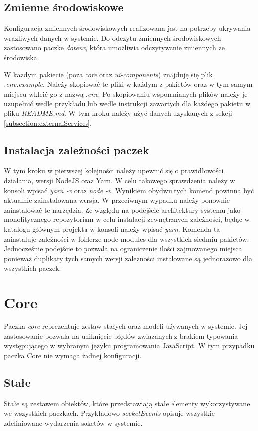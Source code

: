 \label{subsection:envs}
\subsection{Zmienne środowiskowe}
Konfiguracja zmiennych środowiskowych realizowana jest na potrzeby ukrywania wrazliwych danych w systemie.
Do odczytu zmiennych środowiskowych zastosowano paczke \textit{dotenv}, która umożliwia odczytywanie zmiennych ze środowiska.

W każdym pakiecie (poza \textit{core} oraz \textit{ui-components}) znajduję się plik \textit{.env.example}. Należy skopiować te pliki w każdym z pakietów oraz w tym samym miejscu wkleić go z nazwą \textit{.env}. Po skopiowaniu wspomnianych plików należy je uzupełnić wedle przykładu lub wedle instrukcji zawartych dla każdego pakietu w pliku \textit{README.md}. W tym kroku należy użyć danych uzyskanych z sekcji \ref{subsection:externalServices}.

\subsection{Instalacja zależności paczek}
W tym kroku w pierwszej kolejności należy upewnić się o prawidłowości działania, wersji NodeJS oraz Yarn. W celu takowego sprawdzenia należy w konsoli wpisać \textit{yarn -v} oraz \textit{node -v}. Wynikiem obydwu tych komend powinna być aktualnie zainstalowana wersja. W przeciwnym wypadku należy ponownie zainstalować te narzędzia.
Ze względu na podejście architektury systemu jako monolitycznego repozytorium w celu instalacji zewnętrznych zależności, będąc w katalogu głównym projektu w konsoli należy wpisać \textit{yarn}. Komenda ta zainstaluje zależności w folderze node-modules dla wszystkich siedmiu pakietów. Jednocześnie podejście to pozwala na ograniczenie ilości zajmowanego miejsca ponieważ duplikaty tych samych wersji zależności instalowane są jednorazowo dla wszystkich paczek.

\section{Core}
Paczka \textit{core} reprezentuje zestaw stałych oraz modeli używanych w systemie. Jej zastosowanie pozwala na uniknięcie błędów związanych z brakiem typowania występującego w wybranym języku programowania
JavaScript. W tym przypadku paczka Core nie wymaga żadnej konfiguracji.

\subsection{Stałe}
Stałe są zestawem obiektów, które przedstawiają stałe elementy wykorzystywane we wszystkich paczkach. Przykładowo \textit{socketEvents} opisuje wszystkie zdefiniowane wydarzenia soketów w systemie.

